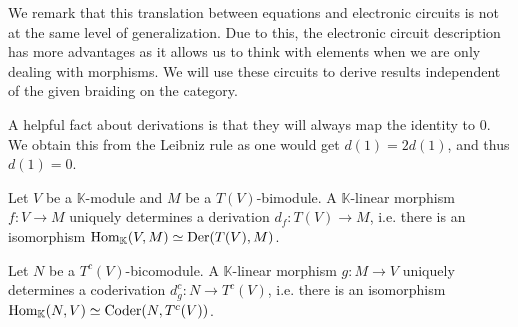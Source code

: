 \documentclass[../thesis.tex]{subfiles}
\begin{document}
\begin{definition}
\begin{center}
                \end{center}
            \end{definition}

            We remark that this translation between equations and electronic circuits is not at the same level of generalization. Due to this, the electronic circuit description has more advantages as it allows us to think with elements when we are only dealing with morphisms. We will use these circuits to derive results independent of the given braiding on the category.

            A helpful fact about derivations is that they will always map the identity to $0$. We obtain this from the Leibniz rule as one would get $d(1) = 2d(1)$, and thus $d(1) = 0$.

            \begin{proposition}\label{prop: tensor-derivation}
                Let $V$ be a $\mathbb{K}$-module and $M$ be a $T(V)$-bimodule. A $\mathbb{K}$-linear morphism $f:V\rightarrow M$ uniquely determines a derivation $d_f:T(V)\rightarrow M$, i.e. there is an isomorphism $\tt{Hom}_{\mathbb{K}}(V,M)\simeq \tt{Der}(T(V),M)$.


                Let $N$ be a $T^c(V)$-bicomodule. A $\mathbb{K}$-linear morphism $g:M\rightarrow V$ uniquely determines a coderivation $d_g^c:N\rightarrow T^c(V)$, i.e. there is an isomorphism $\tt{Hom}_{\mathbb{K}}(N,V)\simeq \tt{Coder}(N,T^c(V))$.
            \end{proposition}
\end{document}
